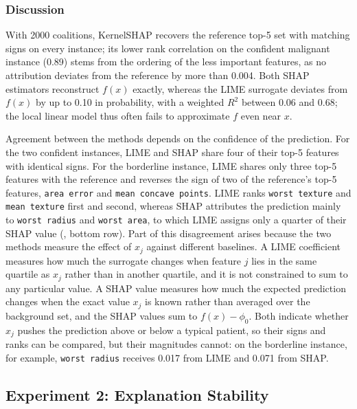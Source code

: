\subsubsection{Discussion}
With 2000 coalitions, KernelSHAP recovers the reference top-5 set with matching signs on every instance; its lower rank correlation on the confident malignant instance (0.89) stems from the ordering of the less important features, as no attribution deviates from the reference by more than 0.004. Both SHAP estimators reconstruct $f(x)$ exactly, whereas the LIME surrogate deviates from $f(x)$ by up to 0.10 in probability, with a weighted $R^2$ between 0.06 and 0.68; the local linear model thus often fails to approximate $f$ even near $x$.

Agreement between the methods depends on the confidence of the prediction. For the two confident instances, LIME and SHAP share four of their top-5 features with identical signs. For the borderline instance, LIME shares only three top-5 features with the reference and reverses the sign of two of the reference's top-5 features, \texttt{area error} and \texttt{mean concave points}. LIME ranks \texttt{worst texture} and \texttt{mean texture} first and second, whereas SHAP attributes the prediction mainly to \texttt{worst radius} and \texttt{worst area}, to which LIME assigns only a quarter of their SHAP value (, bottom row). Part of this disagreement arises because the two methods measure the effect of $x_j$ against different baselines. A LIME coefficient measures how much the surrogate changes when feature $j$ lies in the same quartile as $x_j$ rather than in another quartile, and it is not constrained to sum to any particular value. A SHAP value measures how much the expected prediction changes when the exact value $x_j$ is known rather than averaged over the background set, and the SHAP values sum to $f(x) - \phi_0$. Both indicate whether $x_j$ pushes the prediction above or below a typical patient, so their signs and ranks can be compared, but their magnitudes cannot: on the borderline instance, for example, \texttt{worst radius} receives 0.017 from LIME and 0.071 from SHAP.


\subsection{Experiment 2: Explanation Stability}
\label{sec:instability-divergence}

